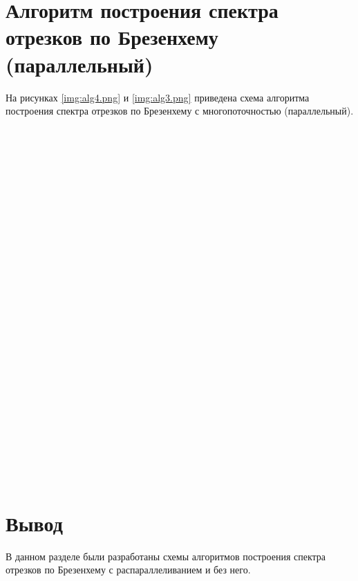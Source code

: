 \section{Алгоритм построения спектра отрезков по Брезенхему (параллельный)}
На рисунках \ref{img:alg4.png} и \ref{img:alg3.png} приведена схема алгоритма построения спектра отрезков по Брезенхему с многопоточностью (параллельный).
\\
\\
\\
\\
\\
\\
\\
\\
\\
\\
\\
\\
\\
\\
\\
\\
\\
\\
\\
\\
\\
\\
\\
\\
\\
\\
\\
\\


\FloatBarrier

\section*{Вывод}

В данном разделе были разработаны схемы алгоритмов построения спектра отрезков по Брезенхему с распараллеливанием и без него.